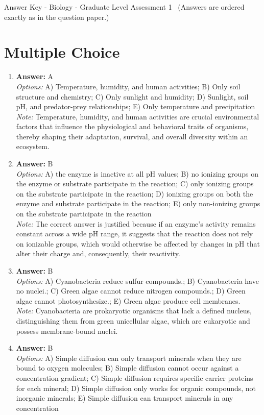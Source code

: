 \documentclass[12pt]{article}
\begin{document}
\begin{center}
Answer Key - Biology - Graduate Level Assessment 1 \
\small (Answers are ordered exactly as in the question paper.)
\end{center}

\section*{Multiple Choice}
\begin{enumerate}[label=\arabic*.]
\item \textbf{Answer:} A
\\ \textit{Options:} A) Temperature, humidity, and human activities; B) Only soil structure and chemistry; C) Only sunlight and humidity; D) Sunlight, soil pH, and predator-prey relationships; E) Only temperature and precipitation
\\ \textit{Note:} Temperature, humidity, and human activities are crucial environmental factors that influence the physiological and behavioral traits of organisms, thereby shaping their adaptation, survival, and overall diversity within an ecosystem.
\item \textbf{Answer:} B
\\ \textit{Options:} A) the enzyme is inactive at all pH values; B) no ionizing groups on the enzyme or substrate participate in the reaction; C) only ionizing groups on the substrate participate in the reaction; D) ionizing groups on both the enzyme and substrate participate in the reaction; E) only non-ionizing groups on the substrate participate in the reaction
\\ \textit{Note:} The correct answer is justified because if an enzyme's activity remains constant across a wide pH range, it suggests that the reaction does not rely on ionizable groups, which would otherwise be affected by changes in pH that alter their charge and, consequently, their reactivity.
\item \textbf{Answer:} B
\\ \textit{Options:} A) Cyanobacteria reduce sulfur compounds.; B) Cyanobacteria have no nuclei.; C) Green algae cannot reduce nitrogen compounds.; D) Green algae cannot photosynthesize.; E) Green algae produce cell membranes.
\\ \textit{Note:} Cyanobacteria are prokaryotic organisms that lack a defined nucleus, distinguishing them from green unicellular algae, which are eukaryotic and possess membrane-bound nuclei.
\item \textbf{Answer:} B
\\ \textit{Options:} A) Simple diffusion can only transport minerals when they are bound to oxygen molecules; B) Simple diffusion cannot occur against a concentration gradient; C) Simple diffusion requires specific carrier proteins for each mineral; D) Simple diffusion only works for organic compounds, not inorganic minerals; E) Simple diffusion can transport minerals in any concentration

\end{enumerate}
\end{document}
